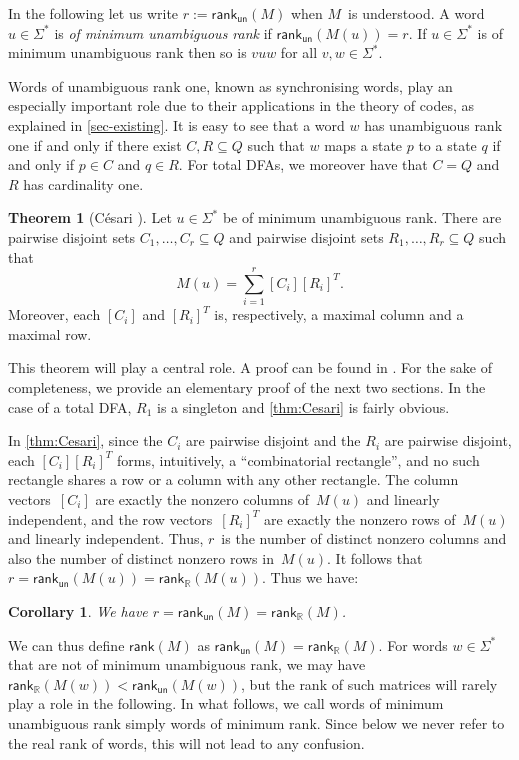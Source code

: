 \documentclass[11pt,a4paper]{amsart}
\newcommand{\rkr}{\mathsf{rank}_{\mathbb{R}}}
\newcommand{\rku}{\mathsf{rank}_{\mathsf{un}}}
\newcommand{\rkg}{\mathsf{rank}}
\theoremstyle{plain}
\newtheorem{cor}[thm]{Corollary}
\theoremstyle{definition}
\theoremstyle{defC}
\theoremstyle{thmC}
\newtheorem{thmC}[thm]{Theorem}
\theoremstyle{plain}
\numberwithin{equation}{section}
\begin{document}
In the following let us write $r := \rku(M)$ when $M$~is understood.
A word $u \in \Sigma^*$ is \emph{of minimum unambiguous rank} if $\rku(M(u)) = r$.
If $u \in \Sigma^*$ is of minimum unambiguous rank then so is $v u w$ for all $v, w \in \Sigma^*$. 

Words of unambiguous rank one, known as synchronising words, play an especially important role due to their applications in the theory of codes, as explained in \autoref{sec-existing}. It is easy to see that a word $w$ has unambiguous rank one if and only if there exist $C, R \subseteq Q$ such that $w$ maps a state $p$ to a state $q$ if and only if $p \in C$ and $q \in R$.
For total DFAs, we moreover have that $C = Q$ and $R$ has cardinality one.

\begin{thmC}[C{\'{e}}sari \cite{Cesari74}] \label{thm:Cesari}
Let $u \in \Sigma^*$ be of minimum unambiguous rank.
There are pairwise disjoint sets $C_1, \ldots, C_r \subseteq Q$ and pairwise disjoint sets $R_1, \ldots, R_r \subseteq Q$ such that \[M(u) = \sum_{i=1}^r [C_i] [R_i]^T.\]
Moreover, each $[C_i]$ and $[R_i]^T$ is, respectively, a maximal column and a maximal row.
\end{thmC}

\noindent
This theorem will play a central role.
A proof can be found in \cite[Proposition 4]{BealCKP08}. For the sake of completeness, we provide an elementary proof of the next two sections.
In the case of a total DFA, $R_1$ is a singleton and \autoref{thm:Cesari} is fairly obvious.



In \autoref{thm:Cesari}, since the $C_i$ are pairwise disjoint and the $R_i$ are pairwise disjoint, each $[C_i] [R_i]^T$ forms, intuitively, a ``combinatorial rectangle'', and no such rectangle shares a row or a column with any other rectangle.
The column vectors~$[C_i]$ are exactly the nonzero columns of~$M(u)$ and linearly independent, and the row vectors~$[R_i]^T$ are exactly the nonzero rows of~$M(u)$ and linearly independent.
Thus, $r$~is the number of distinct nonzero columns and also the number of distinct nonzero rows in~$M(u)$.
It follows that $r = \rku(M(u)) = \rkr(M(u))$. Thus we have:

\begin{cor} \label{cor:ranks-equal}
We have $r = \rku(M) = \rkr(M)$.
\end{cor}

\noindent
We can thus define $\rkg(M)$ as $\rku(M) = \rkr(M)$.
For words $w \in \Sigma^*$ that are not of minimum unambiguous rank, we may have $\rkr(M(w)) < \rku(M(w))$, but the rank of such matrices will rarely play a role in the following. In what follows, we call words of minimum unambiguous rank simply words of minimum rank. Since below we never refer to the real rank of words, this will not lead to any confusion.
\end{document}
